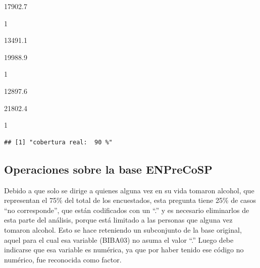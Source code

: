\documentclass[]{book}
\newenvironment{Shaded}{\begin{snugshade}}{\end{snugshade}}
\newcommand{\DataTypeTok}[1]{\textcolor[rgb]{0.13,0.29,0.53}{#1}}
\newcommand{\DecValTok}[1]{\textcolor[rgb]{0.00,0.00,0.81}{#1}}
\newcommand{\KeywordTok}[1]{\textcolor[rgb]{0.13,0.29,0.53}{\textbf{#1}}}
\newcommand{\NormalTok}[1]{#1}
\newcommand{\OperatorTok}[1]{\textcolor[rgb]{0.81,0.36,0.00}{\textbf{#1}}}
\newcommand{\OtherTok}[1]{\textcolor[rgb]{0.56,0.35,0.01}{#1}}
\newcommand{\StringTok}[1]{\textcolor[rgb]{0.31,0.60,0.02}{#1}}
\begin{document}
17902.7

1

13491.1

19988.9

1

12897.6

21802.4

1

\begin{Shaded}
\end{Shaded}

\begin{verbatim}
## [1] "cobertura real:  90 %"
\end{verbatim}

\hypertarget{operaciones-sobre-la-base-enprecosp}{%
\subsection{Operaciones sobre la base ENPreCoSP}\label{operaciones-sobre-la-base-enprecosp}}

Debido a que solo se dirige a quienes alguna vez en su vida tomaron alcohol, que representan el 75\% del total de los encuestados, esta pregunta tiene 25\% de casos ``no corresponde'', que están codificados con un ``.'' y es necesario eliminarlos de esta parte del análisis, porque está limitado a las personas que alguna vez tomaron alcohol. Esto se hace reteniendo un subconjunto de la base original, aquel para el cual esa variable (BIBA03) no asuma el valor ``.'' Luego debe indicarse que esa variable es numérica, ya que por haber tenido ese código no numérico, fue reconocida como factor.

\begin{Shaded}
\end{Shaded}
\end{document}
